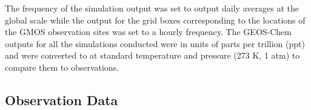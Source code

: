 \begin{table}[H]
\label{tab:geos_chem_simulation_description}

\centering
{}

\end{table}

\begin{flushleft}

 The frequency of the simulation output was set to output daily \hg averages at the global scale while the \hg output for the grid boxes corresponding to the locations of the GMOS observation sites was set to a hourly frequency. The GEOS-Chem outputs for all the simulations conducted were in units of parts per trillion (ppt) and were converted to \nang at standard temperature and pressure (273 K, 1 atm) to compare them to observations.
\end{flushleft}

\subsection{Observation Data}

